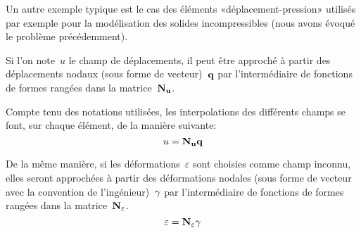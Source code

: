 \medskip
Un autre exemple typique est le cas des éléments «déplacement-pression» utilisés par exemple pour la modélisation des solides incompressibles (nous avons évoqué le problème précédemment).


\bigskip
{}

\medskip
Si l'on note~$u$ le champ de déplacements, il peut être approché à partir des déplacements nodaux (sous forme de vecteur)~$\VV{q}$ par l'intermédiaire de fonctions de formes rangées dans la matrice~$\MM{N_u}$.

Compte tenu des notations utilisées, les interpolations des différents champs se font, sur chaque élément, de la manière suivante:
\begin{equation}
  u=\MM{N_u}\VV{q}
\end{equation}

De la même manière, si les déformations~$\varepsilon$ sont choisies comme champ inconnu, elles seront approchées à partir des déformations nodales (sous forme de vecteur avec la convention de l'ingénieur)~$\VV{\gamma}$ par l'intermédiaire de fonctions de formes rangées dans la matrice~$\MM{N_\varepsilon}$.
\begin{equation}
  \varepsilon = \MM{N_\varepsilon}\VV{\gamma}
\end{equation}

